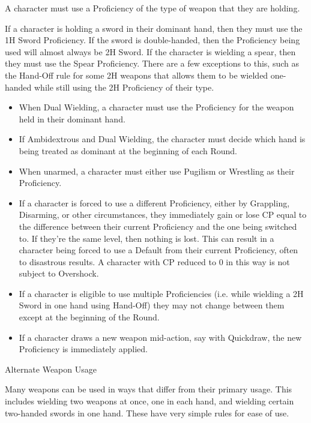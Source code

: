 \documentclass[oneside,11pt,english]{book}
\begin{document}
 

A character must use a Proficiency of the type of weapon that they are holding. 

 

If a character is holding a sword in their dominant hand, then they must use the 1H Sword Proficiency. If 
the sword is double-handed, then the Proficiency being used will almost always be 2H Sword. If the 
character is wielding a spear, then they must use the Spear Proficiency. There are a few exceptions to this, 
such as the Hand-Off rule for some 2H weapons that allows them to be wielded one-handed while still 
using the 2H Proficiency of their type. 
\begin{itemize}
\item When Dual Wielding, a character must use the Proficiency for the weapon held in their dominant 
hand. 
\item If Ambidextrous and Dual Wielding, the character must decide which hand is being treated as 
dominant at the beginning of each Round. 
\item When unarmed, a character must either use Pugilism or Wrestling as their Proficiency. 
\item If a character is forced to use a different Proficiency, either by Grappling, Disarming, or other 
circumstances, they immediately gain or lose CP equal to the difference between their current 
Proficiency and the one being switched to. If they’re the same level, then nothing is lost. This can 
result in a character being forced to use a Default from their current Proficiency, often to 
disastrous results. A character with CP reduced to 0 in this way is not subject to Overshock. 
\item If a character is eligible to use multiple Proficiencies (i.e. while wielding a 2H Sword in one hand 
using Hand-Off) they may not change between them except at the beginning of the Round. 
\item If a character draws a new weapon mid-action, say with Quickdraw, the new Proficiency is 
immediately applied. 
\end{itemize}
 

Alternate Weapon Usage 

 

Many weapons can be used in ways that differ from their primary usage. This includes wielding two 
weapons at once, one in each hand, and wielding certain two-handed swords in one hand. These have very 
simple rules for ease of use. 

 
\end{document}

